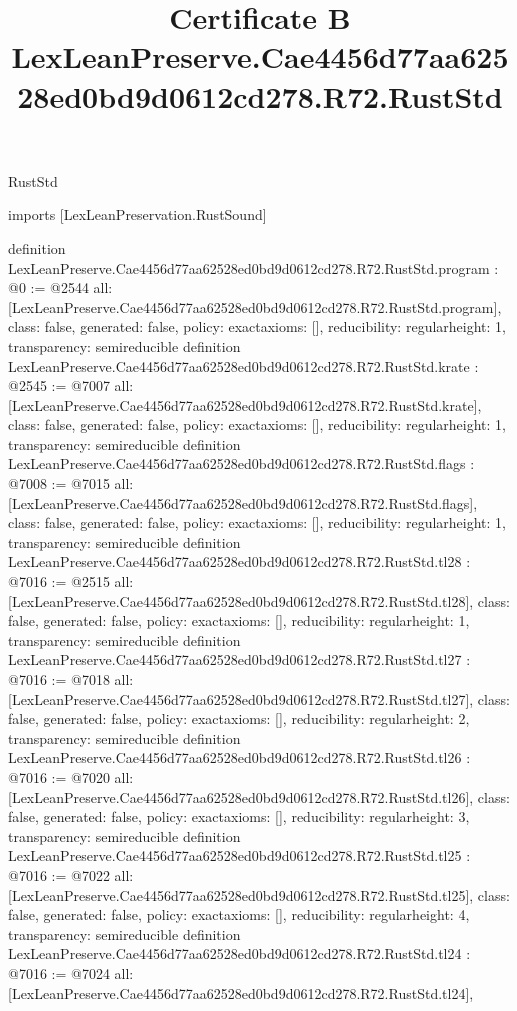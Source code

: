 \begin{lexlean}{RustStd}
\title{Certificate B LexLeanPreserve.Cae4456d77aa62528ed0bd9d0612cd278.R72.RustStd}
\begin{coremodule}
imports [LexLeanPreservation.RustSound]

definition LexLeanPreserve.Cae4456d77aa62528ed0bd9d0612cd278.R72.RustStd.program : @0 := @2544 {
  all: [LexLeanPreserve.Cae4456d77aa62528ed0bd9d0612cd278.R72.RustStd.program],
  class: false,
  generated: false,
  policy: exact{axioms: []},
  reducibility: regular{height: 1},
  transparency: semireducible
}
definition LexLeanPreserve.Cae4456d77aa62528ed0bd9d0612cd278.R72.RustStd.krate : @2545 := @7007 {
  all: [LexLeanPreserve.Cae4456d77aa62528ed0bd9d0612cd278.R72.RustStd.krate],
  class: false,
  generated: false,
  policy: exact{axioms: []},
  reducibility: regular{height: 1},
  transparency: semireducible
}
definition LexLeanPreserve.Cae4456d77aa62528ed0bd9d0612cd278.R72.RustStd.flags : @7008 := @7015 {
  all: [LexLeanPreserve.Cae4456d77aa62528ed0bd9d0612cd278.R72.RustStd.flags],
  class: false,
  generated: false,
  policy: exact{axioms: []},
  reducibility: regular{height: 1},
  transparency: semireducible
}
definition LexLeanPreserve.Cae4456d77aa62528ed0bd9d0612cd278.R72.RustStd.tl28 : @7016 := @2515 {
  all: [LexLeanPreserve.Cae4456d77aa62528ed0bd9d0612cd278.R72.RustStd.tl28],
  class: false,
  generated: false,
  policy: exact{axioms: []},
  reducibility: regular{height: 1},
  transparency: semireducible
}
definition LexLeanPreserve.Cae4456d77aa62528ed0bd9d0612cd278.R72.RustStd.tl27 : @7016 := @7018 {
  all: [LexLeanPreserve.Cae4456d77aa62528ed0bd9d0612cd278.R72.RustStd.tl27],
  class: false,
  generated: false,
  policy: exact{axioms: []},
  reducibility: regular{height: 2},
  transparency: semireducible
}
definition LexLeanPreserve.Cae4456d77aa62528ed0bd9d0612cd278.R72.RustStd.tl26 : @7016 := @7020 {
  all: [LexLeanPreserve.Cae4456d77aa62528ed0bd9d0612cd278.R72.RustStd.tl26],
  class: false,
  generated: false,
  policy: exact{axioms: []},
  reducibility: regular{height: 3},
  transparency: semireducible
}
definition LexLeanPreserve.Cae4456d77aa62528ed0bd9d0612cd278.R72.RustStd.tl25 : @7016 := @7022 {
  all: [LexLeanPreserve.Cae4456d77aa62528ed0bd9d0612cd278.R72.RustStd.tl25],
  class: false,
  generated: false,
  policy: exact{axioms: []},
  reducibility: regular{height: 4},
  transparency: semireducible
}
definition LexLeanPreserve.Cae4456d77aa62528ed0bd9d0612cd278.R72.RustStd.tl24 : @7016 := @7024 {
  all: [LexLeanPreserve.Cae4456d77aa62528ed0bd9d0612cd278.R72.RustStd.tl24],
}
\end{coremodule}
\end{lexlean}
